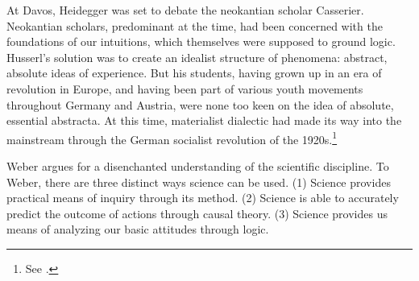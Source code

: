 \documentclass[leqno, 12pt]{turabian-researchpaper}
\begin{document}
	At Davos, Heidegger was set to debate the neokantian scholar Casserier. Neokantian
	scholars, predominant at the time, had been concerned with the foundations of our
	intuitions, which themselves were supposed to ground logic. Husserl's solution
	was to create an idealist structure of phenomena: abstract, absolute ideas of experience.
	But his students, having grown up in an era of revolution in Europe, and
	having been part of various youth movements throughout Germany and Austria, were
	none too keen on the idea of absolute, essential abstracta. At this time,
	materialist dialectic had made its way into the mainstream through the German
	socialist revolution of the 1920s.\footnote{See \autocite{dambock2022}.}

	Weber argues for a disenchanted understanding of the scientific discipline. To
	Weber, there are three distinct ways science can be used. (1) Science provides
	practical means of inquiry through its method. (2) Science is able to accurately
	predict the outcome of actions through causal theory. (3) Science provides us
	means of analyzing our basic attitudes through logic. \fi

	\iffalse This enumeration limits the scope of the sciences. Science does all this
	and nothing further. All valuation, to Weber, is outside the scope of the
	sciences. It can help us to analyze these evaluations by providing us logic and
	material prediction, but it cannot then say that such outcomes are desirable. Because
	of this limitation, value theory could not be done in the laboratory. Instead,
	it must take to the streets and prioritize its facticity. In this way Weber's ethical
	theory has an existentialist dimension; and it is this dimension which binds
	our opposed thinkers. Weber theorized that the modern era saw a shift from religious
	certainty into disenchantment, a move from theological faith and autocratic
	rule toward scientific reason and democratic liberalism. For Carnap, this was
	a sign that metaphysics \blockquote[{\citetitle[xvii]{carnap2003}}]{belongs to the past.}
	To Heidegger, disenchantment signalled a crisis, and an opportunity to rethink
	the whole tradition of philosophical thought. This move was inspired by Gogarten
	and his dialectical theology \autocite{dambock2022}. This movement sought to found
	ethical theory in transcendent experience of God \textit{beyond} scientific
	rationality. \fi
\end{document}
